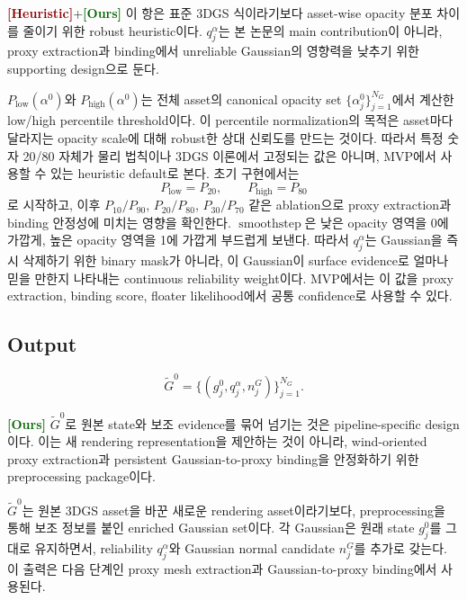 \documentclass[11pt,a4paper]{article}
\newcommand{\smoothstep}{\operatorname{smoothstep}}
\newcommand{\ours}{\textcolor{darkgreen}{\textbf{[Ours]}}}
\newcommand{\heuristic}{\textcolor{darkred}{\textbf{[Heuristic]}}}
\begin{document}
\noindent\heuristic\;+\;\ours\;
이 항은 표준 3DGS 식이라기보다 asset-wise opacity 분포 차이를 줄이기 위한 robust heuristic이다.
$q_j^\alpha$는 본 논문의 main contribution이 아니라, proxy extraction과 binding에서 unreliable Gaussian의 영향력을 낮추기 위한 supporting design으로 둔다.

$P_{\mathrm{low}}(\alpha^0)$와 $P_{\mathrm{high}}(\alpha^0)$는 전체 asset의 canonical opacity set $\{\alpha_j^0\}_{j=1}^{N_G}$에서 계산한 low/high percentile threshold이다.
이 percentile normalization의 목적은 asset마다 달라지는 opacity scale에 대해 robust한 상대 신뢰도를 만드는 것이다.
따라서 특정 숫자 20/80 자체가 물리 법칙이나 3DGS 이론에서 고정되는 값은 아니며, MVP에서 사용할 수 있는 heuristic default로 본다.
초기 구현에서는
\[
P_{\mathrm{low}}=P_{20},\qquad P_{\mathrm{high}}=P_{80}
\]
로 시작하고, 이후 $P_{10}/P_{90}$, $P_{20}/P_{80}$, $P_{30}/P_{70}$ 같은 ablation으로 proxy extraction과 binding 안정성에 미치는 영향을 확인한다.
$\smoothstep$은 낮은 opacity 영역을 0에 가깝게, 높은 opacity 영역을 1에 가깝게 부드럽게 보낸다.
따라서 $q_j^\alpha$는 Gaussian을 즉시 삭제하기 위한 binary mask가 아니라, 이 Gaussian이 surface evidence로 얼마나 믿을 만한지 나타내는 continuous reliability weight이다.
MVP에서는 이 값을 proxy extraction, binding score, floater likelihood에서 공통 confidence로 사용할 수 있다.

\subsection*{Output}

\begin{equation}
\widetilde{G}^0=\{(g_j^0,q_j^\alpha,n_j^G)\}_{j=1}^{N_G}.
\end{equation}

\vspace{-0.5em}

\noindent\ours\;
$\widetilde{G}^0$로 원본 state와 보조 evidence를 묶어 넘기는 것은 pipeline-specific design이다.
이는 새 rendering representation을 제안하는 것이 아니라, wind-oriented proxy extraction과 persistent Gaussian-to-proxy binding을 안정화하기 위한 preprocessing package이다.

$\widetilde{G}^0$는 원본 3DGS asset을 바꾼 새로운 rendering asset이라기보다, preprocessing을 통해 보조 정보를 붙인 enriched Gaussian set이다.
각 Gaussian은 원래 state $g_j^0$를 그대로 유지하면서, reliability $q_j^\alpha$와 Gaussian normal candidate $n_j^G$를 추가로 갖는다.
이 출력은 다음 단계인 proxy mesh extraction과 Gaussian-to-proxy binding에서 사용된다.
\end{document}
